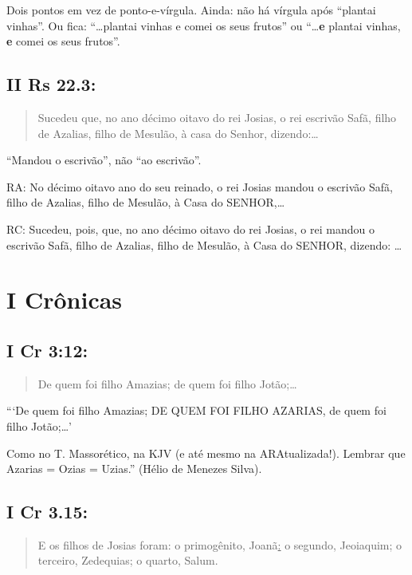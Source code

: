 Dois pontos em vez de ponto-e-vírgula. Ainda: não há vírgula após ``plantai vinhas''. Ou fica: ``\ldots plantai vinhas e comei os seus frutos'' ou ``\ldots \textbf{e} plantai vinhas, \textbf{e} comei os seus frutos''.

\subsection*{II Rs 22.3:} 
\begin{quote}
    \small
Sucedeu que, no ano décimo oitavo do rei Josias, o rei  escrivão Safã, filho de Azalias, filho de Mesulão, à casa do Senhor, dizendo:\ldots
\end{quote}

``Mandou o escrivão'', não ``ao escrivão''.

RA: No décimo oitavo ano do seu reinado, o rei Josias mandou o escrivão Safã, filho de Azalias, filho de Mesulão, à Casa do SENHOR,\ldots

RC: Sucedeu, pois, que, no ano décimo oitavo do rei Josias, o rei mandou o escrivão Safã, filho de Azalias, filho de Mesulão, à Casa do SENHOR, dizendo: \ldots

\section{I Crônicas}
\subsection*{I Cr 3:12:} 
\begin{quote}
    \small
De quem foi filho Amazias; de quem foi filho Jotão;\ldots
\end{quote}

```De quem foi filho Amazias; DE QUEM FOI FILHO AZARIAS, de quem foi filho Jotão;\ldots'

Como no T. Massorético, na KJV (e até mesmo na ARAtualizada!). Lembrar que Azarias = Ozias = Uzias.'' (Hélio de Menezes Silva).

\subsection*{I Cr 3.15:} 
\begin{quote}
    \small
E os filhos de Josias foram: o primogênito, Joanã\uline{:} o segundo, Jeoiaquim; o terceiro, Zedequias; o quarto, Salum.
\end{quote}

